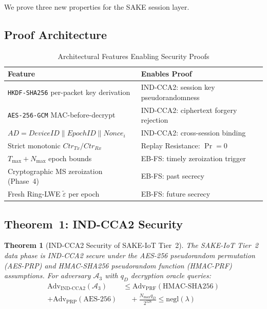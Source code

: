 \documentclass[conference]{IEEEtran}
\newtheorem{theorem}{Theorem}
\newcommand{\GCM}{\texttt{AES-256-GCM}}
\newcommand{\HKDF}{\texttt{HKDF-SHA256}}
\newcommand{\Nmax}{N_{\max}}
\newcommand{\Tmax}{T_{\max}}
\begin{document}
We prove three new properties for the SAKE session layer.

\subsection{Proof Architecture}

\begin{table}[!t]
\centering
\small
\caption{Architectural Features Enabling Security Proofs}
\label{tab:proofarch}
\renewcommand{\arraystretch}{1.1}
\begin{tabular}{p{3.8cm}p{4.0cm}}
\toprule
\textbf{Feature} & \textbf{Enables Proof} \\
\midrule
\HKDF{} per-packet key derivation & IND-CCA2: session key pseudorandomness \\
\GCM{} MAC-before-decrypt & IND-CCA2: ciphertext forgery rejection \\
$AD = \mathit{DeviceID} \| \mathit{EpochID} \| \mathit{Nonce}_i$ & IND-CCA2: cross-session binding \\
Strict monotonic $\mathit{Ctr}_{Tx}/\mathit{Ctr}_{Rx}$ & Replay Resistance: $\Pr = 0$ \\
$\Tmax + \Nmax$ epoch bounds & EB-FS: timely zeroization trigger \\
Cryptographic MS zeroization (Phase~4) & EB-FS: past secrecy \\
Fresh Ring-LWE $\tilde{\varepsilon}$ per epoch & EB-FS: future secrecy \\
\bottomrule
\end{tabular}
\end{table}

\subsection{Theorem~1: IND-CCA2 Security}

\begin{theorem}[IND-CCA2 Security of SAKE-IoT Tier~2]
\label{thm:indcca2}
The SAKE-IoT Tier~2 data phase is IND-CCA2 secure under the AES-256
pseudorandom permutation (AES-PRP) and HMAC-SHA256 pseudorandom function
(HMAC-PRF) assumptions. For adversary $\mathcal{A}_3$ with $q_D$ decryption
oracle queries:
\begin{equation}
\begin{split}
\mathrm{Adv}_{\mathrm{IND\text{-}CCA2}}(\mathcal{A}_3)
&\le
\mathrm{Adv}_{\mathrm{PRF}}(\mathrm{HMAC\text{-}SHA256}) \\
+ \mathrm{Adv}_{\mathrm{PRP}}(\mathrm{AES\text{-}256}) 
&\quad
+ \frac{N_{\max} q_D}{2^{128}}
\le \mathrm{negl}(\lambda)
\end{split}
\end{equation}
\end{theorem}
\end{document}
